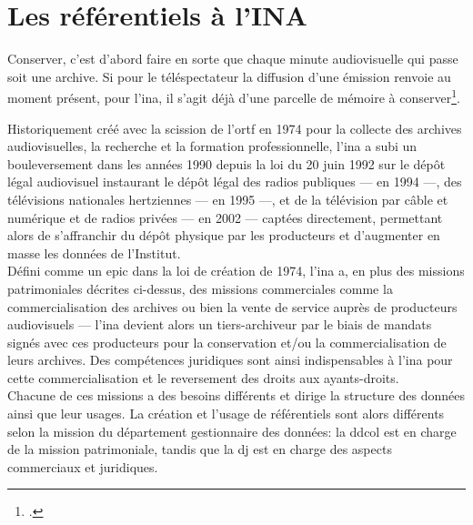 \chapter{\label{I-B}Les référentiels à l’INA}

\begin{citationLongue}
	Conserver, c’est d’abord faire en sorte que chaque minute audiovisuelle qui passe soit une archive. Si pour le téléspectateur la diffusion d’une émission renvoie au moment présent, pour l’\ac{ina}, il s’agit déjà d’une parcelle de mémoire à conserver\footcite[p.45]{hoog_lina_2006}.
\end{citationLongue}
Historiquement créé avec la scission de l'\ac{ortf} en 1974 pour la collecte des archives audiovisuelles, la recherche et la formation professionnelle, l'\ac{ina} a subi un bouleversement dans les années 1990 depuis la loi du 20 juin 1992 sur le dépôt légal audiovisuel instaurant le dépôt légal des radios publiques --- en 1994 ---, des télévisions nationales hertziennes --- en 1995 ---, et de la télévision par câble et numérique et de radios privées --- en 2002 ---  captées directement, permettant alors de s'affranchir du dépôt physique par les producteurs et d'augmenter en masse les données de l'Institut.\\

Défini comme un \ac{epic} dans la loi de création de 1974, l'\ac{ina} a, en plus des missions patrimoniales décrites ci-dessus, des missions commerciales comme la commercialisation des archives ou bien la vente de service auprès de producteurs audiovisuels --- l'\ac{ina} devient alors un tiers-archiveur par le biais de mandats signés avec ces producteurs pour la conservation et/ou la commercialisation de leurs archives. Des compétences juridiques sont ainsi indispensables à l'\ac{ina} pour cette commercialisation et le reversement des droits aux ayants-droits.\\

Chacune de ces missions a des besoins différents et dirige la structure des données  ainsi que leur usages. La création et l'usage de référentiels sont alors différents selon la mission du département gestionnaire des données: la \ac{ddcol} est en charge de la mission patrimoniale, tandis que la \ac{dj} est en charge des aspects commerciaux et juridiques.





